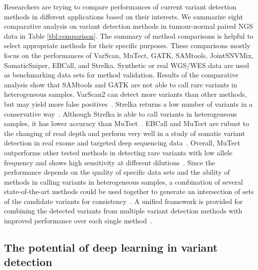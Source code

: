 \documentclass[a4,center,fleqn]{NAR}
\begin{document}
Researchers are trying to compare performances of current variant detection methods in different applications based on their interests.
We summarize eight comparative analysis on variant detection methods in tumour-normal paired NGS data in Table \ref{tbl:comparison}.
The summary of method comparisons is helpful to select appropriate methods for their specific purposes.
These comparisons mostly focus on the performances of VarScan, MuTect, GATK, SAMtools, JointSNVMix, SomaticSniper, EBCall, and Strelka.
Synthetic or real WGS/WES data are used as benchmarking data sets for method validation.
Results of the comparative analysis show that SAMtools and GATK are not able to call rare variants in heterogeneous samples.
VarScan2 can detect more variants than other methods, but may yield more false positives~\citep{wang2013detecting, Spencer2014}.
Strelka returns a low number of variants in a conservative way~\citep{kroigaard2016evaluation}.
Although Strelka is able to call variants in heterogeneous samples, it has lower accuracy than MuTect~\citep{wang2013detecting}.
EBCall and MuTect are rubust to the changing of read depth and perform very well in a study of somatic variant detection in real exome and targeted deep sequencing data~\citep{kroigaard2016evaluation}.
Overall, MuTect outperforms other tested methods in detecting rare variants with low allele frequency and shows high sensitivity at different dilutions~\citep{wang2013detecting, Xu2014}.
Since the performance depends on the quality of specific data sets and the ability of methods in calling variants in heterogeneous samples, a combination of several state-of-the-art methods could be used together to generate an intersection of sets of the candidate variants for consistency~\citep{liu2013variant}.
A unified framework is provided for combining the detected variants from multiple variant detection methods with improved performance over each single method~\citep{kim2014combining}.


\subsection{The potential of deep learning in variant detection}
\end{document}
